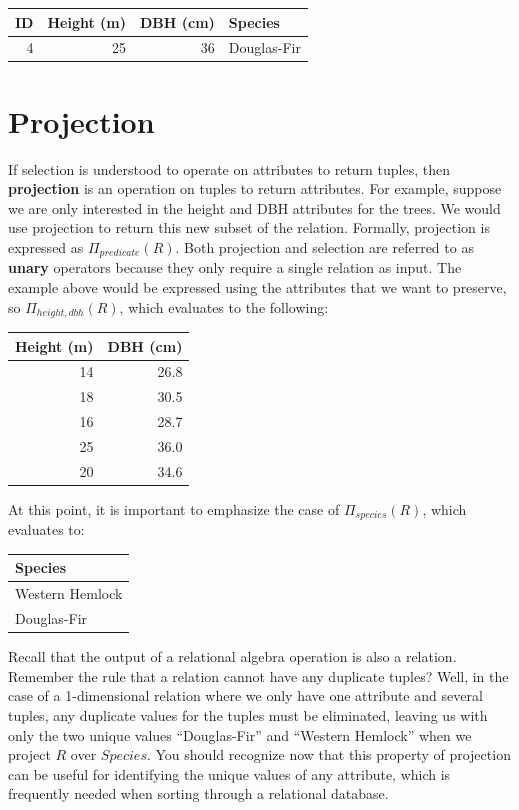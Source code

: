 \documentclass[
]{book}
\begin{document}
\begin{tabular}{rrrl}
\toprule
ID & Height (m) & DBH (cm) & Species\\
\midrule
4 & 25 & 36 & Douglas-Fir\\
\bottomrule
\end{tabular}

\section{Projection}\label{projection}

If selection is understood to operate on attributes to return tuples, then \textbf{projection} is an operation on tuples to return attributes. For example, suppose we are only interested in the height and DBH attributes for the trees. We would use projection to return this new subset of the relation. Formally, projection is expressed as \(Π_{predicate}(R)\). Both projection and selection are referred to as \textbf{unary} operators because they only require a single relation as input. The example above would be expressed using the attributes that we want to preserve, so \(Π_{height,dbh}(R)\), which evaluates to the following:

\begin{tabular}{rr}
\toprule
Height (m) & DBH (cm)\\
\midrule
14 & 26.8\\
18 & 30.5\\
16 & 28.7\\
25 & 36.0\\
20 & 34.6\\
\bottomrule
\end{tabular}

At this point, it is important to emphasize the case of \(Π_{species}(R)\), which evaluates to:

\begin{tabular}{l}
\toprule
Species\\
\midrule
Western Hemlock\\
Douglas-Fir\\
\bottomrule
\end{tabular}

Recall that the output of a relational algebra operation is also a relation. Remember the rule that a relation cannot have any duplicate tuples? Well, in the case of a 1-dimensional relation where we only have one attribute and several tuples, any duplicate values for the tuples must be eliminated, leaving us with only the two unique values ``Douglas-Fir'' and ``Western Hemlock'' when we project \(R\) over \(Species\). You should recognize now that this property of projection can be useful for identifying the unique values of any attribute, which is frequently needed when sorting through a relational database.
\end{document}
